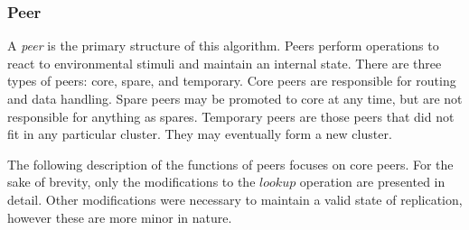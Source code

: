 \documentclass[12pt]{report}
\theoremstyle{plain}
\begin{document}
		
		\subsubsection*{Peer}
		A \textit{peer} is the primary structure of this algorithm. 
		Peers perform operations to react to environmental stimuli and maintain an internal state. 
		There are three types of peers: core, spare, and temporary.
		Core peers are responsible for routing and data handling.
		Spare peers may be promoted to core at any time, but are not responsible for anything as spares.
		Temporary peers are those peers that did not fit in any particular cluster. 
		They may eventually form a new cluster.

		The following description of the functions of peers focuses on core peers.
		For the sake of brevity, only the modifications to the $lookup$ operation are presented in detail.
		Other modifications were necessary to maintain a valid state of replication, however these are more minor in nature.
\end{document}
